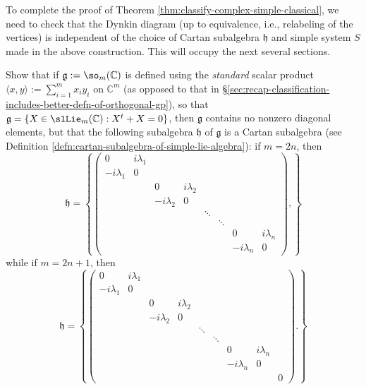 \documentclass[reqno]{amsart} 
\begin{document}
To complete the proof of Theorem \ref{thm:classify-complex-simple-classical}, we need to check that the Dynkin diagram (up to equivalence, i.e., relabeling of the vertices) is independent of the choice of Cartan subalgebra $\mathfrak{h}$ and simple system $S$ made in the above construction.  This will occupy the next several sections.

\begin{exercise}
  Show that if $\mathfrak{g} := \so_m(\mathbb{C})$ is defined using the \emph{standard} scalar product $\langle x,y \rangle := \sum_{i=1}^m x_i y_i$ on $\mathbb{C}^m$ (as opposed to that in \S\ref{sec:recap-classification-includes-better-defn-of-orthogonal-gp}), so that $\mathfrak{g} = \{X \in \slLie_m(\mathbb{C}) : X^t + X = 0\}$, then $\mathfrak{g}$ contains no nonzero diagonal elements, but that the following subalgebra $\mathfrak{h}$ of $\mathfrak{g}$ is a Cartan subalgebra (see Definition \ref{defn:cartan-subalgebra-of-simple-lie-algebra}): if $m = 2 n$, then
  \begin{equation*}
    \mathfrak{h} = \left\{
      \begin{pmatrix}
        0 & i \lambda_1  & & & & & & \\
        -i \lambda_1 & 0 & & & & & &  \\
          & & 0 & i \lambda_2  & & & &    \\
          & & -i \lambda_2 & 0  & & & &  \\
          & & & & \ddots &    & &    \\
          & & & &  & \ddots   & &  \\
          & & & & & & 0 & i \lambda_n    \\
          & & & & & & -i \lambda_n & 0
      \end{pmatrix}
,
    \right\}
  \end{equation*}
  while if $m = 2 n + 1$, then
  \begin{equation*}
    \mathfrak{h} = \left\{
      \begin{pmatrix}
        0 & i \lambda_1  & & & & & & & \\
        -i \lambda_1 & 0 & & & & & & &  \\
          & & 0 & i \lambda_2  & & & & &   \\
          & & -i \lambda_2 & 0  & & & &  & \\
          & & & & \ddots &    & &  &  \\
          & & & &  & \ddots   & & &  \\
          & & & & & & 0 & i \lambda_n &   \\
          & & & & & & -i \lambda_n & 0 & \\
          & & & & & &  &  & 0
      \end{pmatrix}
.
    \right\}
  \end{equation*}
\end{exercise}
\end{document}

